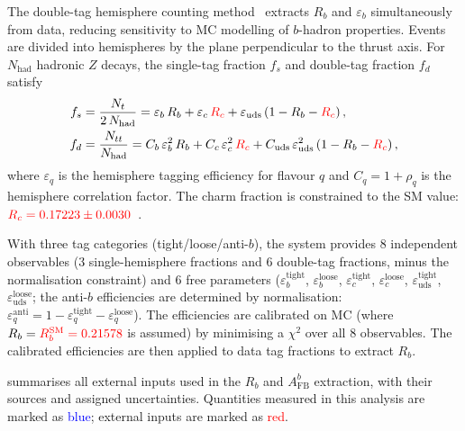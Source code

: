 \documentclass[11pt,a4paper]{article}
\newcommand{\measured}[1]{\textcolor{blue}{#1}}
\newcommand{\external}[1]{\textcolor{red}{#1}}
\begin{document}
The double-tag hemisphere counting method~\cite{LEP:HF:2001,ALEPH:Rb:1996}
extracts $R_b$ and $\varepsilon_b$ simultaneously from data,
reducing sensitivity to MC modelling of $b$-hadron properties.
Events are divided into hemispheres by the plane perpendicular to
the thrust axis.
For $N_\text{had}$ hadronic $Z$ decays, the single-tag fraction
$f_s$ and double-tag fraction $f_d$ satisfy
\begin{align}
f_s &= \frac{N_t}{2\,N_\text{had}} = \varepsilon_b\,R_b +
  \varepsilon_c\,\external{R_c} +
  \varepsilon_\text{uds}\,(1 - R_b - \external{R_c})\,,
\label{eq:fs} \\
f_d &= \frac{N_{tt}}{N_\text{had}} =
  C_b\,\varepsilon_b^2\,R_b +
  C_c\,\varepsilon_c^2\,\external{R_c} +
  C_\text{uds}\,\varepsilon_\text{uds}^2\,
  (1 - R_b - \external{R_c})\,,
\label{eq:fd}
\end{align}
where $\varepsilon_q$ is the hemisphere tagging efficiency for
flavour $q$ and $C_q = 1 + \rho_q$ is the hemisphere correlation
factor.
The charm fraction is constrained to the SM value:
$\external{R_c = 0.17223 \pm 0.0030}$~\cite{LEP:EWWG:2005}.

With three tag categories (tight/loose/anti-$b$), the system
provides 8 independent observables (3 single-hemisphere fractions
and 6 double-tag fractions, minus the normalisation constraint)
and 6 free parameters
($\varepsilon_b^\text{tight}$, $\varepsilon_b^\text{loose}$,
$\varepsilon_c^\text{tight}$, $\varepsilon_c^\text{loose}$,
$\varepsilon_\text{uds}^\text{tight}$, $\varepsilon_\text{uds}^\text{loose}$;
the anti-$b$ efficiencies are determined by normalisation:
$\varepsilon_q^\text{anti} = 1 - \varepsilon_q^\text{tight} - \varepsilon_q^\text{loose}$).
The efficiencies are calibrated on MC (where
$R_b = \external{R_b^\text{SM} = 0.21578}$ is assumed) by
minimising a $\chi^2$ over all 8 observables.
The calibrated efficiencies are then applied to data tag fractions
to extract $R_b$.

 summarises all external inputs used in
the $R_b$ and $A_\text{FB}^b$ extraction, with their sources and
assigned uncertainties.
Quantities measured in this analysis are marked as \measured{blue};
external inputs are marked as \external{red}.
\end{document}

